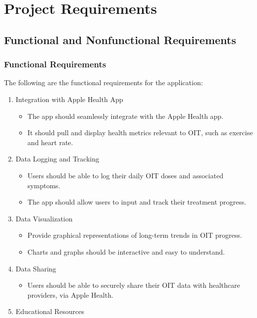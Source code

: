\chapter{Project Requirements}

\section{Functional and Nonfunctional Requirements}

\subsection{Functional Requirements}
The following are the functional requirements for the application:
    \begin{enumerate}
        \item Integration with Apple Health App
        \begin{itemize}
            \item The app should seamlessly integrate with the Apple Health app.
            \item It should pull and display health metrics relevant to OIT, such as exercise and heart rate.
        \end{itemize}
        \item Data Logging and Tracking
        \begin{itemize}
            \item Users should be able to log their daily OIT doses and associated symptoms.
            \item The app should allow users to input and track their treatment progress.
        \end{itemize}
        \item Data Visualization
        \begin{itemize}
            \item Provide graphical representations of long-term trends in OIT progress.
            \item Charts and graphs should be interactive and easy to understand.
        \end{itemize}
        \item Data Sharing
        \begin{itemize}
            \item Users should be able to securely share their OIT data with healthcare providers, via Apple Health.
        \end{itemize}
        \item Educational Resources

\end{enumerate}
